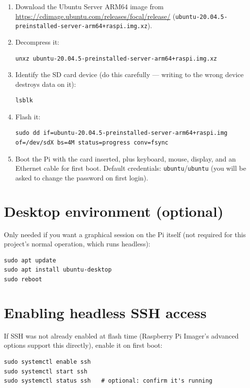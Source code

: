 \documentclass[11pt]{report}
\begin{document}
\begin{enumerate}
  \item Download the Ubuntu Server ARM64 image from
  \url{https://cdimage.ubuntu.com/releases/focal/release/}
  (\texttt{ubuntu-20.04.5-preinstalled-server-arm64+raspi.img.xz}).
  \item Decompress it:
\begin{lstlisting}[style=shell]
unxz ubuntu-20.04.5-preinstalled-server-arm64+raspi.img.xz
\end{lstlisting}
  \item Identify the SD card device (do this carefully --- writing to the
  wrong device destroys data on it):
\begin{lstlisting}[style=shell]
lsblk
\end{lstlisting}
  \item Flash it:
\begin{lstlisting}[style=shell]
sudo dd if=ubuntu-20.04.5-preinstalled-server-arm64+raspi.img of=/dev/sdX bs=4M status=progress conv=fsync
\end{lstlisting}
  \item Boot the Pi with the card inserted, plus keyboard, mouse, display,
  and an Ethernet cable for first boot. Default credentials:
  \texttt{ubuntu}/\texttt{ubuntu} (you will be asked to change the password
  on first login).
\end{enumerate}

\section{Desktop environment (optional)}

Only needed if you want a graphical session on the Pi itself (not required
for this project's normal operation, which runs headless):

\begin{lstlisting}[style=shell]
sudo apt update
sudo apt install ubuntu-desktop
sudo reboot
\end{lstlisting}

\section{Enabling headless SSH access}

If SSH was not already enabled at flash time (Raspberry Pi Imager's advanced
options support this directly), enable it on first boot:

\begin{lstlisting}[style=shell]
sudo systemctl enable ssh
sudo systemctl start ssh
sudo systemctl status ssh   # optional: confirm it's running
\end{lstlisting}
\end{document}
